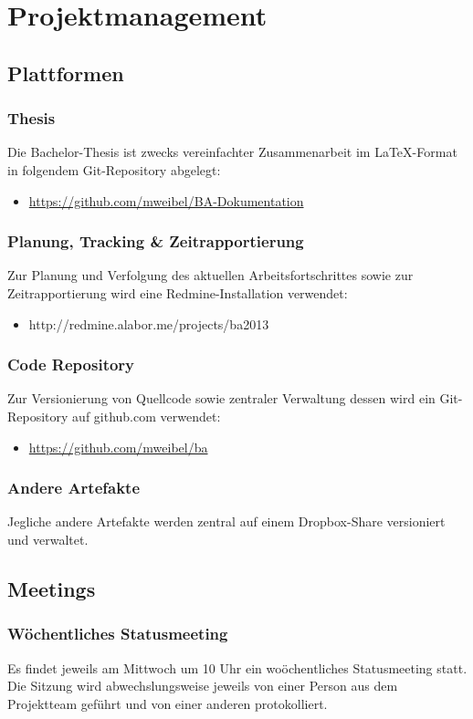 \chapter{Projektmanagement}

\section{Plattformen}
\subsection{Thesis}
Die Bachelor-Thesis ist zwecks vereinfachter Zusammenarbeit im LaTeX-Format in folgendem Git-Repository abgelegt:
\begin{itemize}
	\item \url{https://github.com/mweibel/BA-Dokumentation}
\end{itemize}

\subsection{Planung, Tracking \& Zeitrapportierung}
Zur Planung und Verfolgung des aktuellen Arbeitsfortschrittes sowie zur Zeitrapportierung wird eine Redmine-Installation verwendet:
\begin{itemize}
	\item http://redmine.alabor.me/projects/ba2013
\end{itemize}

\subsection{Code Repository}
Zur Versionierung von Quellcode sowie zentraler Verwaltung dessen wird ein Git-Repository auf github.com verwendet:
\begin{itemize}
	\item \url{https://github.com/mweibel/ba}
\end{itemize}

\subsection{Andere Artefakte}
Jegliche andere Artefakte werden zentral auf einem Dropbox-Share versioniert und verwaltet.


\section{Meetings}
\subsection{Wöchentliches Statusmeeting}
Es findet jeweils am Mittwoch um 10 Uhr ein woöchentliches Statusmeeting statt. Die Sitzung wird abwechslungsweise jeweils von einer Person aus dem Projektteam geführt und von einer anderen protokolliert.

